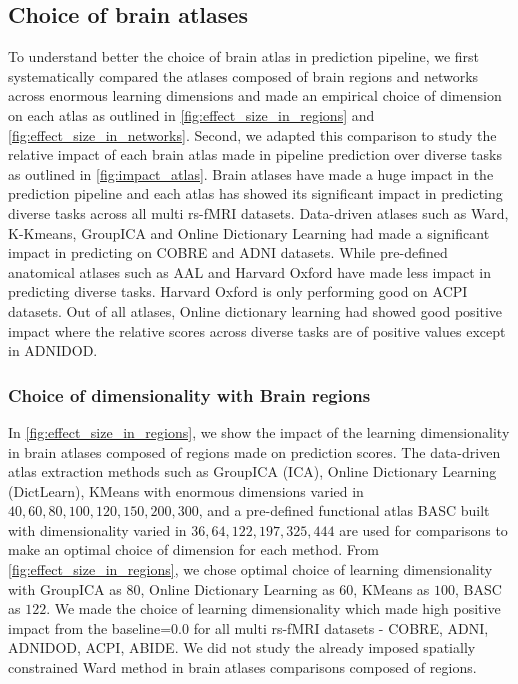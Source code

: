 \documentclass[5p]{elsarticle}
\begin{document}
\subsection{Choice of brain atlases}
To understand better the choice of brain atlas in prediction pipeline,
we first systematically compared the atlases composed of brain regions and
networks across enormous learning dimensions and
made an empirical choice of dimension on each atlas as outlined in
\autoref{fig:effect_size_in_regions} and \autoref{fig:effect_size_in_networks}.
Second, we adapted this comparison to study the relative impact of each
brain atlas made in pipeline prediction over diverse tasks as
outlined in \autoref{fig:impact_atlas}. Brain atlases have made a huge
impact in the prediction pipeline and each atlas has showed its significant
impact in predicting diverse tasks across all multi rs-fMRI datasets.
Data-driven atlases such as Ward, K-Kmeans, GroupICA and Online Dictionary
Learning had made a significant impact in predicting on COBRE and ADNI
datasets. While pre-defined anatomical atlases such as AAL and Harvard Oxford
have made less impact in predicting diverse tasks. Harvard Oxford is only
performing good on ACPI datasets. Out of all atlases, Online dictionary
learning had showed good positive impact where the relative scores across
diverse tasks are of positive values except in ADNIDOD.

\subsubsection{Choice of dimensionality with Brain regions}
In \autoref{fig:effect_size_in_regions}, we show the impact of the
learning dimensionality in brain atlases composed of regions
made on prediction scores. The
data-driven atlas extraction methods such as GroupICA (ICA), Online Dictionary
Learning (DictLearn), KMeans with enormous dimensions varied in ${40, 60,
80, 100, 120, 150, 200, 300}$, and a pre-defined functional atlas BASC built with
dimensionality varied in ${36, 64, 122, 197, 325, 444}$ are used for
comparisons to make an optimal choice of dimension for each method. From
\autoref{fig:effect_size_in_regions}, we chose optimal choice of
learning dimensionality with GroupICA as $80$, Online Dictionary Learning as
$60$, KMeans as $100$, BASC as $122$. We made the choice of learning
dimensionality which made high positive impact from the baseline=$0.0$ for
all multi rs-fMRI datasets - COBRE, ADNI, ADNIDOD, ACPI, ABIDE. We did not
study the already imposed spatially constrained Ward method in brain atlases
comparisons composed of regions. 
\end{document}
